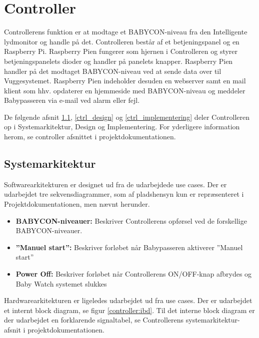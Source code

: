 \chapter{Controller}

Controllerens funktion er at modtage et BABYCON-niveau fra den Intelligente lydmonitor og handle på det. Controlleren består af et betjeningspanel og en Raspberry Pi. Raspberry Pien fungerer som hjernen i Controlleren og styrer betjeningspanelets dioder og handler på panelets knapper. Raspberry Pien handler på det modtaget BABYCON-niveau ved at sende data over \iic til Vuggesystemet. Raspberry Pien indeholder desuden en webserver samt en mail klient som hhv. opdaterer en hjemmeside med BABYCON-niveau og meddeler Babypasseren via e-mail ved alarm eller fejl.

De følgende afsnit \ref{ctrl_sysark}, \ref{ctrl_design} og \ref{ctrl_implementering} deler Controlleren op i Systemarkitektur, Design og Implementering. For yderligere information herom, se controller afsnittet i projektdokumentationen.

\section{Systemarkitektur}
\label{ctrl_sysark}

Softwarearkitekturen er designet ud fra de udarbejdede use cases. Der er udarbejdet tre sekvensdiagrammer, som af pladshensyn kun er repræsenteret i Projektdokumentationen, men nævnt herunder. 

\begin{itemize}
\item \textbf{BABYCON-niveauer:} Beskriver Controllerens opførsel ved de forskellige BABYCON-niveauer.
\item \textbf{''Manuel start'':} Beskriver forløbet når Babypasseren aktiverer ''Manuel start''
\item \textbf{Power Off:} Beskriver forløbet når Controllerens ON/OFF-knap afbrydes og Baby Watch systemet slukkes 
\end{itemize}

Hardwarearkitekturen er ligeledes udarbejdet ud fra use cases. Der er udarbejdet et internt block diagram, se figur \ref{controller:ibd}. Til det interne block diagram er der udarbejdet en forklarende signaltabel, se Controllerens systemarkitektur-afsnit i projektdokumentationen.



